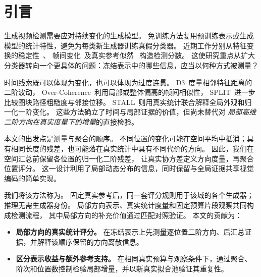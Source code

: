 \section{引言}
\label{sec:introduction}

生成视频检测需要应对持续变化的生成模型。
免训练方法复用预训练表示或生成模型的统计特性，避免为每类新生成器训练真假分类器。
近期工作分别从特征变换的稳定性~\cite{choi2025warpad}、
帧间变化~\cite{zheng2025d3,brokman2026overcoherence}及真实参考似然~\cite{benhayun2026stall}
构造检测分数。
这使研究重点从扩大分类器转向一个更具体的问题：冻结表示中的哪些信息，应当以何种方式被测量？

时间线索既可以体现为变化，也可以体现为过度连贯。
D3~\cite{zheng2025d3}度量相邻特征距离的二阶波动，
Over-Coherence~\cite{brokman2026overcoherence}利用局部或整体偏高的帧间相似性，
SPLIT~\cite{hyun2026split}进一步比较图块路径粗糙度与邻接位移。
STALL~\cite{benhayun2026stall}则用真实统计联合解释全局外观和归一化一阶变化。
这些方法确立了时间与局部证据的价值，但尚未替代对
\emph{局部高维二阶方向在真实度量下的增量}的直接检验。

本文的出发点是测量与聚合的顺序。
不同位置的变化可能在空间平均中抵消；具有相同长度的残差，也可能落在真实统计中具有不同代价的方向。
因此，我们在空间汇总前保留各位置的归一化二阶残差，
让真实协方差定义方向度量，再聚合位置评分。
这一设计利用了局部动态分布的信息，同时保留与全局证据共享视觉编码的简单实现。

我们将该方法称为\method。
固定真实参考后，同一套评分规则用于该域的各个生成器；推理无需生成器身份。
局部方向表示、真实统计度量和固定预算片段观察共同构成检测流程，
其中局部方向的补充价值通过匹配对照验证。
本文的贡献为：
\begin{itemize}
  \item \textbf{局部方向的真实统计评分。}
  在冻结表示上先测量逐位置二阶方向、后汇总证据，并解释该顺序保留的方向离散信息。
  \item \textbf{区分表示收益与额外参考支持。}
  在相同真实预算与观察条件下，通过聚合、阶次和位置数控制检验局部增量，并以新真实拟合池验证其重复性。
\end{itemize}
